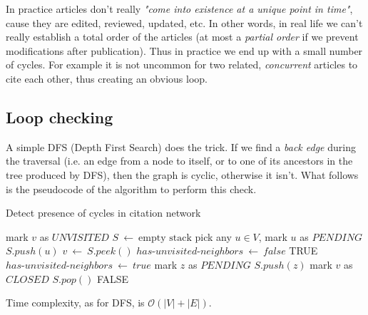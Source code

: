 In practice articles don't really \textit{"come into existence at a unique point in time"}, cause they are edited, reviewed, updated, etc.
In other words, in real life we can't really establish a total order of
the articles (at most a \textit{partial order} if we prevent modifications
after publication). Thus in practice we end up with a small number of
cycles. For example it is not uncommon for two
related, \textit{concurrent} articles to cite each other, thus creating an
obvious loop.

\subsection{Loop checking}

A simple DFS (Depth First Search) does the trick. If we find a
\textit{back edge} during the traversal (i.e. an edge from a node to
itself, or to one of its ancestors in the tree produced by DFS), then
the graph is cyclic, otherwise it isn't. What follows is the pseudocode 
of the algorithm to perform this check.
\newpage
\begin{algorithm}
	\caption{Detect presence of cycles in citation network}
	\label{loop_check}
	\begin{algorithmic}[1]
			\State mark $v$ as $UNVISITED$
		\EndFor
		\State $S \ \leftarrow \ \text{empty stack}$
		\State pick any $u \in V$, mark $u$ as $PENDING$
		\State $S.push(u)$
			\State $v \ \leftarrow \ S.peek()$
			\State $has\text{-}unvisited\text{-}neighbors \ \leftarrow \ false$
					\State \Return TRUE
					\State $has\text{-}unvisited\text{-}neighbors \ \leftarrow \ true$
					\State mark $z$ as $PENDING$
					\State $S.push(z)$
				\EndIf
			\EndFor
				\State mark $v$ as $CLOSED$
				\State $S.pop()$
			\EndIf
		\EndWhile
		\State \Return FALSE
	\end{algorithmic}
\end{algorithm}
\medskip

\noindent Time complexity, as for DFS, is $\mathcal{O}(|V|+|E|)$.
